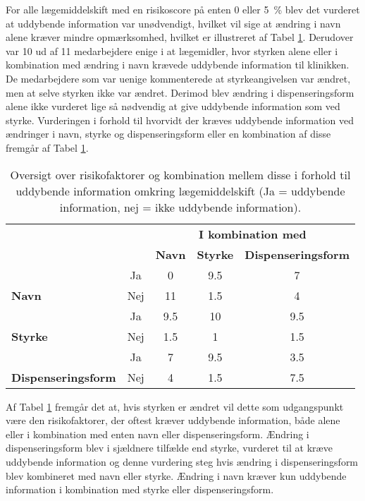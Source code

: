 For alle lægemiddelskift med en risikoscore på enten 0 eller 5~\% blev det vurderet at uddybende information var unødvendigt, hvilket vil sige at ændring i navn alene kræver mindre opmærksomhed, hvilket er illustreret af Tabel \ref{table:risikofaktorer}. Derudover var 10 ud af 11 medarbejdere enige i at lægemidler, hvor styrken alene eller i kombination med ændring i navn krævede uddybende information til klinikken. De medarbejdere som var uenige kommenterede at styrkeangivelsen var ændret, men at selve styrken ikke var ændret. Derimod blev ændring i dispenseringsform alene ikke vurderet lige så nødvendig at give uddybende information som ved styrke. Vurderingen i forhold til hvorvidt der kræves uddybende information ved ændringer i navn, styrke og dispenseringsform eller en kombination af disse fremgår af Tabel \ref{table:risikofaktorer}.

\begin{table}[H]
\caption{Oversigt over risikofaktorer og kombination mellem disse i forhold til uddybende information omkring lægemiddelskift (Ja = uddybende information, nej = ikke uddybende information).}
\vspace{2mm}
\label{table:risikofaktorer}
\centering
\begin{tabular}{l c|c|c|c}
\rowcolor[HTML]{C0C0C0} & & \multicolumn{3}{c}{\textbf{I kombination med}} \\
\rowcolor[HTML]{C0C0C0} & & \textbf{Navn}& \textbf{Styrke} & \textbf{Dispenseringsform} \\
\cellcolor[HTML]{C0C0C0} & \cellcolor[HTML]{C0C0C0}Ja & 0 & 9.5 & 7 \\ \cline{2-5}	   
\multirow{-2}{*}{\cellcolor[HTML]{C0C0C0}\textbf{Navn}} & \cellcolor[HTML]{C0C0C0}Nej & 11 & 1.5 & 4\\ \hline 
\cellcolor[HTML]{C0C0C0} &  \cellcolor[HTML]{C0C0C0}Ja & 9.5 & 10 & 9.5 \\ \cline{2-5}	   
\multirow{-2}{*}{\cellcolor[HTML]{C0C0C0}\textbf{Styrke}} & \cellcolor[HTML]{C0C0C0}Nej & 1.5 & 1 & 1.5\\ \hline 
\cellcolor[HTML]{C0C0C0} & \cellcolor[HTML]{C0C0C0}Ja & 7 & 9.5 & 3.5 \\ \cline{2-5}	   
\multirow{-2}{*}{\cellcolor[HTML]{C0C0C0}\textbf{Dispenseringsform}} & \cellcolor[HTML]{C0C0C0}Nej & 4 & 1.5 & 7.5 \\ \hline 
\end{tabular}
\end{table}

Af Tabel \ref{table:risikofaktorer} fremgår det at, hvis styrken er ændret vil dette som udgangspunkt være den risikofaktorer, der oftest kræver uddybende information, både alene eller i kombination med enten navn eller dispenseringsform. Ændring i dispenseringsform blev i sjældnere tilfælde end styrke, vurderet til at kræve uddybende information og denne vurdering steg hvis ændring i dispenseringsform blev kombineret med navn eller styrke. Ændring i navn kræver kun uddybende information i kombination med styrke eller dispenseringsform. 

